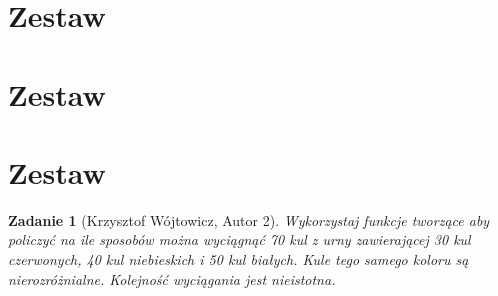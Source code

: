 \documentclass{mwart}
\newtheorem{zad}{Zadanie}[section]
\begin{document}
\newpage
\section{Zestaw}          %

\newpage
\section{Zestaw}          %

\newpage
\section{Zestaw}          %

\begin{zad}[Krzysztof Wójtowicz, Autor 2]
    Wykorzystaj funkcje tworzące aby policzyć na ile sposobów można wyciągnąć 70 kul z urny zawierającej 30 kul czerwonych, 40 kul niebieskich i 50 kul białych. Kule tego samego koloru są nierozróżnialne. Kolejność wyciągania jest nieistotna.
\end{zad}
\end{document}
